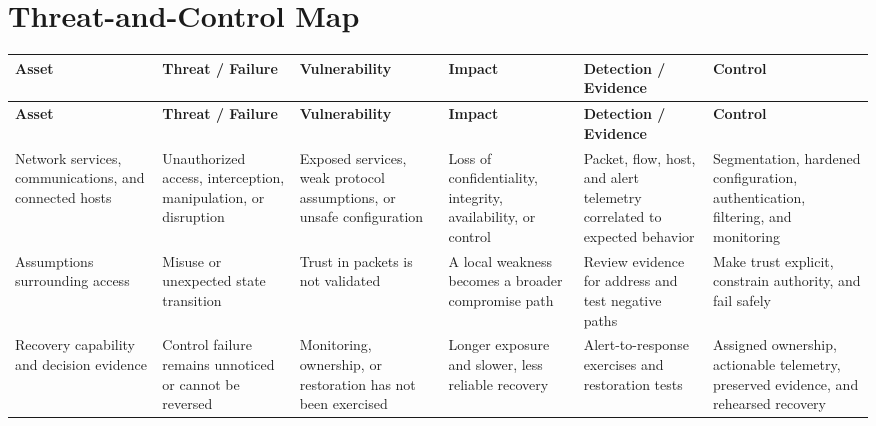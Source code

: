 \documentclass[11pt]{article}
\begin{document}
\section*{Threat-and-Control Map}
\begingroup\scriptsize\setlength{\tabcolsep}{2pt}
\begin{longtable}{>{\RaggedRight\arraybackslash}p{}>{\RaggedRight\arraybackslash}p{}>{\RaggedRight\arraybackslash}p{}>{\RaggedRight\arraybackslash}p{}>{\RaggedRight\arraybackslash}p{}>{\RaggedRight\arraybackslash}p{}}
\toprule\rowcolor{Navy}\color{white}\textbf{Asset} & \color{white}\textbf{Threat / Failure} & \color{white}\textbf{Vulnerability} & \color{white}\textbf{Impact} & \color{white}\textbf{Detection / Evidence} & \color{white}\textbf{Control}\\\midrule
\endfirsthead
\toprule\rowcolor{Navy}\color{white}\textbf{Asset} & \color{white}\textbf{Threat / Failure} & \color{white}\textbf{Vulnerability} & \color{white}\textbf{Impact} & \color{white}\textbf{Detection / Evidence} & \color{white}\textbf{Control}\\\midrule
\endhead
Network services, communications, and connected hosts & Unauthorized access, interception, manipulation, or disruption & Exposed services, weak protocol assumptions, or unsafe configuration & Loss of confidentiality, integrity, availability, or control & Packet, flow, host, and alert telemetry correlated to expected behavior & Segmentation, hardened configuration, authentication, filtering, and monitoring\\\midrule
Assumptions surrounding access & Misuse or unexpected state transition & Trust in packets is not validated & A local weakness becomes a broader compromise path & Review evidence for address and test negative paths & Make trust explicit, constrain authority, and fail safely\\\midrule
Recovery capability and decision evidence & Control failure remains unnoticed or cannot be reversed & Monitoring, ownership, or restoration has not been exercised & Longer exposure and slower, less reliable recovery & Alert-to-response exercises and restoration tests & Assigned ownership, actionable telemetry, preserved evidence, and rehearsed recovery\\\midrule
\bottomrule
\end{longtable}
\endgroup
\end{document}
